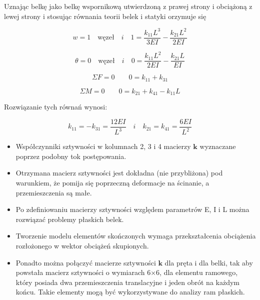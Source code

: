 Uznając belkę jako belkę wspornikową utwierdzoną z prawej strony i obciążoną z lewej strony i stosując równania teorii belek i statyki orzymuje się

\begin{equation}
\label{eq:asdadddddd1}
w=1 \quad \mathrm{węzeł} \quad i \quad  1=\frac{k_{11}L^3}{3EI}-\frac{k_{21}L^2}{2EI}
\end{equation}

\begin{equation}
\label{eq:asdadddddd2}
\theta=0 \quad \mathrm{węzeł} \quad i \quad  0=\frac{k_{11}L^2}{2EI}-\frac{k_{21}L}{EI}
\end{equation}

\begin{equation}
\label{eq:asdadddddd3}
\varSigma F=0 \qquad  0=k_{11}+k_{31}
\end{equation}


\begin{equation}
\label{eq:asdadddddd4}
\varSigma M=0  \qquad  0=k_{21}+k_{41}-k_{11}L
\end{equation}

Rozwiązanie tych równań wynosi:

\begin{equation}
\label{eq:asdaddasdaaaaadddd}
k_{11}=-k_{31}=\frac{12EI}{L^3} \quad i \quad k_{21}=k_{41}=\frac{6EI}{L^2}
\end{equation}

\begin{itemize}
    \item Współczynniki sztywności w kolumnach 2, 3 i 4 macierzy $\bm{k}$ wyznaczane poprzez podobny tok postępowania.
    \item Otrzymana macierz sztywności jest dokładna (nie przybliżona) pod warunkiem, że
pomija się poprzeczną deformacje na ścinanie, a przemieszczenia są małe.
    \item Po zdefiniowaniu macierzy sztywności względem parametrów E, I i L można rozwiązać problemy płaskich belek.
    \item Tworzenie modelu elementów skończonych wymaga przekształcenia obciążenia
rozłożonego w wektor obciążeń skupionych.
    \item Ponadto można połączyć macierze sztywności $\bm{k}$ dla pręta i dla belki, tak aby powstała
macierz sztywności o wymiarach 6×6, dla elementu ramowego, który posiada dwa
przemieszczenia translacyjne i jeden obrót na każdym końcu. Takie elementy mogą
być wykorzystywane do analizy ram płaskich.
\end{itemize}

